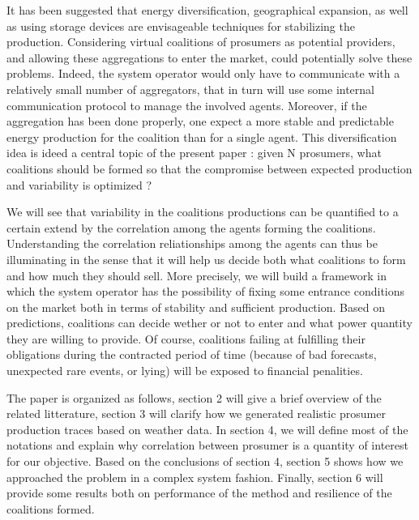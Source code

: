 \documentclass[conference]{IEEEtran}
\begin{document}
It has been suggested that energy diversification, geographical expansion, as well as using storage devices are envisageable techniques for  stabilizing the production. Considering virtual coalitions of prosumers as potential providers, and allowing these aggregations to enter the market, could potentially solve these problems. Indeed, the system operator would only have to communicate with a relatively small number of aggregators, that in turn will use some internal communication protocol to manage the involved agents. Moreover, if the aggregation has been done properly, one expect a more stable and predictable energy production for the coalition than for a single agent. This diversification idea is ideed a central topic of the present paper : given N prosumers, what coalitions should be formed so that the compromise between expected production and variability is optimized ?

We will see that variability in the coalitions productions can be quantified to a certain extend by the correlation among the agents forming the coalitions. Understanding the correlation reliationships among the agents can thus be illuminating in the sense that it will help us decide both what coalitions to form and how much they should sell. More precisely, we will build a framework in which the system operator has the possibility of fixing some entrance conditions on the market both in terms of stability and sufficient production. Based on predictions, coalitions can decide wether or not to enter and what power quantity they are willing to provide. Of course, coalitions failing at fulfilling their obligations during the contracted period of time (because of bad forecasts, unexpected rare events, or lying) will be exposed to financial penalities.

The paper is organized as follows, section 2 will give a brief overview of the related litterature, section 3 will clarify how we generated realistic prosumer production traces based on weather data. In section 4, we will define most of the notations and explain why correlation between prosumer is a quantity of interest for our objective. Based on the conclusions of section 4, section 5 shows how we approached the problem in a complex system fashion. Finally, section 6 will provide some results both on performance of the method and resilience of the coalitions formed.


%
%
\end{document}
